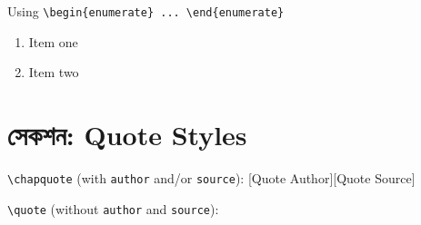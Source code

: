 \documentclass[12pt]{article}
\begin{document}
Using \verb|\begin{enumerate} ... \end{enumerate}|
\begin{enumerate}
        \item Item one
        \item Item two
\end{enumerate}    

\lipsum[3]

\section*{সেকশন: Quote Styles}

\begin{mylist}
        \item \verb|\chapquote| (with \verb|author| and/or \verb|source|):
                [Quote Author][Quote Source]
        \item \verb|\quote| (without \verb|author| and \verb|source|):
\end{mylist}



\end{document}
